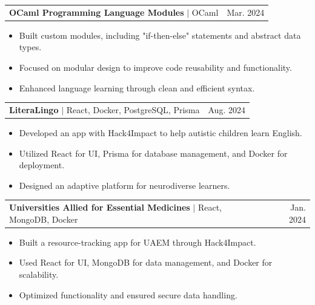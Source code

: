 \documentclass[letterpaper,11pt]{article}
\makeatletter
\newcommand{\resumeItem}[1]{
  \item\small{
    {#1 \vspace{-2pt}}
  }
}
\newcommand{\resumeProjectHeading}[2]{
    \item
    \begin{tabular*}{0.97\textwidth}{l@{\extracolsep{\fill}}r}
      \small#1 & #2 \\
    \end{tabular*}\vspace{-7pt}
}
\newcommand{\resumeItemListStart}{\begin{itemize}}
\newcommand{\resumeItemListEnd}{\end{itemize}\vspace{-5pt}}
\makeatother
\begin{document}
\resumeProjectHeading
  {\textbf{OCaml Programming Language Modules} $|$ OCaml}{Mar. 2024}
  \resumeItemListStart
    \resumeItem{Built custom modules, including "if-then-else" statements and abstract data types.}
    \resumeItem{Focused on modular design to improve code reusability and functionality.}
    \resumeItem{Enhanced language learning through clean and efficient syntax.}
  \resumeItemListEnd
  
  \resumeProjectHeading
  {\textbf{LiteraLingo} $|$ React, Docker, PostgreSQL, Prisma}{Aug. 2024}
  \resumeItemListStart
    \resumeItem{Developed an app with Hack4Impact to help autistic children learn English.}
    \resumeItem{Utilized React for UI, Prisma for database management, and Docker for deployment.}
    \resumeItem{Designed an adaptive platform for neurodiverse learners.}
  \resumeItemListEnd


\resumeProjectHeading
  {\textbf{Universities Allied for Essential Medicines} $|$ React, MongoDB, Docker}{Jan. 2024}
  \resumeItemListStart
    \resumeItem{Built a resource-tracking app for UAEM through Hack4Impact.}
    \resumeItem{Used React for UI, MongoDB for data management, and Docker for scalability.}
    \resumeItem{Optimized functionality and ensured secure data handling.}
  \resumeItemListEnd
\end{document}
